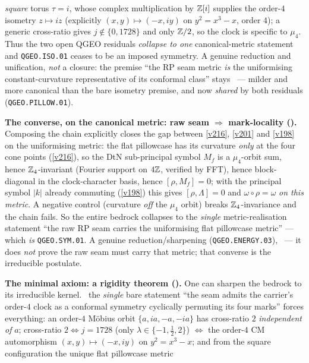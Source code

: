 \emph{square} torus $\tau=i$, whose complex multiplication by $\mathbb Z[i]$ supplies the order-$4$ isometry
$z\mapsto iz$ (explicitly $(x,y)\mapsto(-x,iy)$ on $y^2=x^3-x$, order $4$); a generic cross-ratio gives
$j\notin\{0,1728\}$ and only $\mathbb Z/2$, so the clock is specific to $\mu_4$. Thus the two open QGEO residuals
\emph{collapse to one} canonical-metric statement and \texttt{QGEO.ISO.01} ceases to be an imposed
symmetry. A genuine reduction and unification, \emph{not} a closure: the premise ``the RP seam metric
\emph{is} the uniformising constant-curvature representative of its conformal class'' stays \mO\ ---
milder and more canonical than the bare isometry premise, and now \emph{shared} by both residuals
(\texttt{QGEO.PILLOW.01}).
\par\smallskip\noindent\textbf{The converse, on the canonical metric: raw seam $\Rightarrow$ mark-locality
().} Composing the chain explicitly closes the gap between
\vref{v216}, \vref{v201} and \vref{v198} on the uniformising metric: the flat pillowcase has its curvature
\emph{only} at the four cone points (\vref{v216}), so the DtN sub-principal symbol $M_f$ is a $\mu_4$-orbit
sum, hence $\mathbb Z_4$-invariant (Fourier support on $4\mathbb Z$, verified by FFT), hence block-diagonal in the
clock-character basis, hence $[\rho,M_f]=0$; with the principal symbol $|k|$ already commuting (\vref{v198})
this gives $[\rho,\Lambda]=0$ and $\omega\circ\rho=\omega$ \emph{on this metric}. A negative control (curvature
\emph{off} the $\mu_4$ orbit) breaks $\mathbb Z_4$-invariance and the chain fails. So the entire bedrock collapses
to the \emph{single} metric-realisation statement ``the raw RP seam carries the uniformising flat pillowcase
metric'' --- which \emph{is} \texttt{QGEO.SYM.01}. A genuine reduction/sharpening (\texttt{QGEO.ENERGY.03}),
\mO\ --- it does \emph{not} prove the raw seam must carry that metric; that converse is the irreducible
postulate.
\par\smallskip\noindent\textbf{The minimal axiom: a rigidity theorem ().}
One can sharpen the bedrock to its irreducible kernel. \mE\ the \emph{single} bare statement ``the seam admits
the carrier's order-$4$ clock as a conformal symmetry cyclically permuting its four marks'' forces everything:
an order-$4$ M\"obius orbit $\{a,ia,-a,-ia\}$ has cross-ratio $2$ \emph{independent of} $a$; cross-ratio $2
\Leftrightarrow j{=}1728$ (only $\lambda\in\{-1,\tfrac12,2\}$) $\Leftrightarrow$ the order-$4$ CM automorphism
$(x,y)\mapsto(-x,iy)$ on $y^2{=}x^3{-}x$; and from the square configuration the unique flat pillowcase metric
